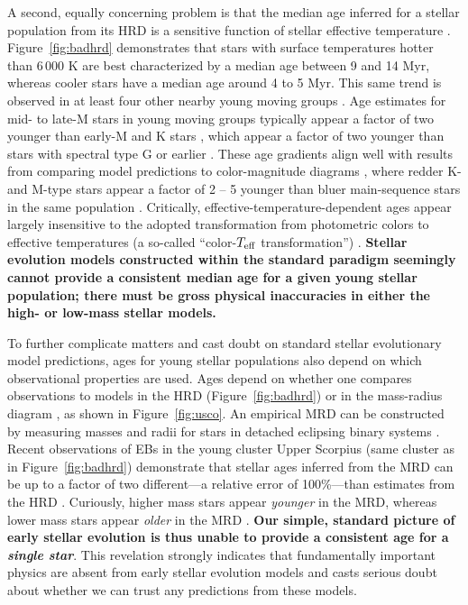 A second, equally concerning problem is that the median age inferred for a stellar population from its HRD is a sensitive function of stellar effective temperature \citep{Herczeg2015}. Figure~\ref{fig:badhrd} demonstrates that stars with surface temperatures hotter than 6\,000 K are best characterized by a median age between 9 and 14 Myr, whereas cooler stars have a median age around 4 to 5 Myr. This same trend is observed in at least four other nearby young moving groups \citep{Herczeg2015}. Age estimates for mid- to late-M stars in young moving groups typically appear a factor of two younger than early-M and K stars \citep{Malo2014, Herczeg2015}, which appear a factor of two younger than stars with spectral type G or earlier \citep{Hillenbrand2008}. These age gradients align well with results from comparing model predictions to color-magnitude diagrams \citep{Naylor2009}, where redder K- and M-type stars appear a factor of 2 -- 5 younger than bluer main-sequence stars in the same population \citep{Naylor2009, Bell2012}. Critically, effective-temperature-dependent ages appear largely insensitive to the adopted transformation from photometric colors to effective temperatures (a so-called ``color-$T_{\rm eff}$ transformation'') \citep{Herczeg2015}. {\bf Stellar evolution models constructed within the standard paradigm seemingly cannot provide a consistent median age for a given young stellar population; there must be gross physical inaccuracies in either the high- or low-mass stellar models.}

To further complicate matters and cast doubt on standard stellar evolutionary model predictions, ages for young stellar populations also depend on which observational properties are used. Ages depend on whether one compares observations to models in the HRD (Figure~\ref{fig:badhrd}) or in the mass-radius diagram \citep[MRD;][]{Kraus2015}, as shown in Figure~\ref{fig:usco}. An empirical MRD can be constructed by measuring masses and radii for stars in detached eclipsing binary systems \citep[EBs;][]{Andersen1991, Torres2010}. Recent observations of EBs in the young cluster Upper Scorpius (same cluster as in Figure~\ref{fig:badhrd}) demonstrate that stellar ages inferred from the MRD can be up to a factor of two different---a relative error of 100\%---than estimates from the HRD \citep[see Figure~\ref{fig:usco};][]{Kraus2015, Alonso2015, David2016}. Curiously, higher mass stars appear {\it younger} in the MRD, whereas lower mass stars appear {\it older} in the MRD \citep{Feiden2016}. {\bf Our simple, standard picture of early stellar evolution is thus unable to provide a consistent age for a \emph{single star}}. This revelation strongly indicates that fundamentally important physics are absent from early stellar evolution models and casts serious doubt about whether we can trust any predictions from these models. 

